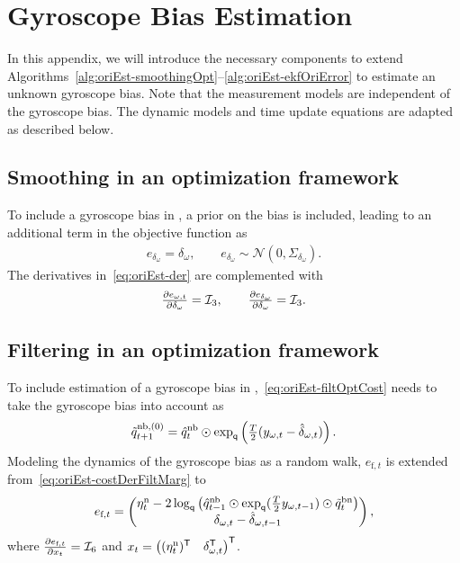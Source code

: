 \chapter{Gyroscope Bias Estimation}
\label{app:estGyroBias}
In this appendix, we will introduce the necessary components to extend Algorithms~\ref{alg:oriEst-smoothingOpt}--\ref{alg:oriEst-ekfOriError} to estimate an unknown gyroscope bias. Note that the measurement models are independent of the gyroscope bias. The dynamic models and time update equations are adapted as described below.

\section{Smoothing in an optimization framework}
To include a gyroscope bias in , a prior on the bias is included, leading to an additional term in the objective function as
\begin{align}
e_{\delta_\omega} = \delta_\omega, \qquad e_{\delta_\omega} \sim \mathcal{N}(0, \Sigma_{\delta_\omega}).
\end{align}
The derivatives in~\eqref{eq:oriEst-der} are complemented with
\begin{align}
\tfrac{\partial e_{\omega,t} }{\partial \delta_\omega} = \mathcal{I}_3, \qquad \tfrac{\partial e_{\delta_\omega} }{\partial \delta_\omega} = \mathcal{I}_3.
\end{align}

\section{Filtering in an optimization framework}
To include estimation of a gyroscope bias in ,~\eqref{eq:oriEst-filtOptCost} needs to take the gyroscope bias into account as 
\begin{align}
\tilde{q}^{\text{nb},(0)}_{t+1} = \hat{q}^\text{nb}_t \odot \exp_\mathsf{q} \left( \tfrac{T}{2} ( y_{\omega,t} - \hat{\delta}_{\omega,t} ) \right).
\end{align}
Modeling the dynamics of the gyroscope bias as a random walk, $e_{\text{f},t}$ is extended from~\eqref{eq:oriEst-costDerFiltMarg} to 
\begin{align}
e_{\text{f},t} = \begin{pmatrix} 
\eta^\text{n}_{t}- 2 \log_\mathsf{q} \left(\hat{q}_{t-1}^\text{nb} \odot \exp_\mathsf{q} (\tfrac{T}{2} y_{\omega,t-1} ) \odot  \tilde{q}_{t}^\text{bn} \right) \\
\delta_{\omega,t} - \hat{\delta}_{\omega,t-1}
\end{pmatrix}, 
\end{align}
where $\tfrac{\partial e_{\text{f},t}}{\partial x_t} = \mathcal{I}_6$ and $x_t = \begin{pmatrix} (\eta^\text{n}_{t})^{\mathsf{T}} & \delta_{\omega,t}^{\mathsf{T}} \end{pmatrix}^{\mathsf{T}}$.

